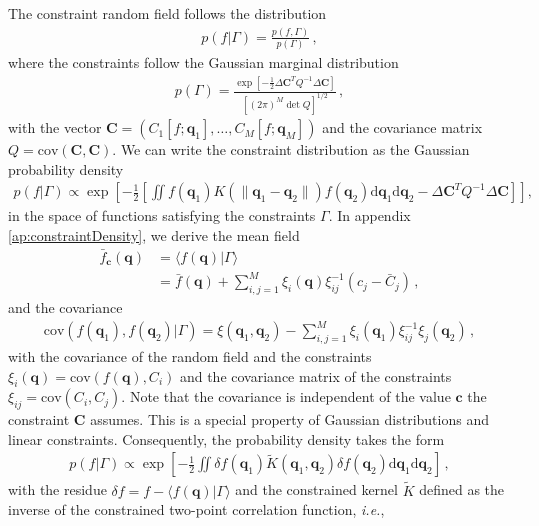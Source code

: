 \documentclass[a4paper, 11pt]{article}
\begin{document}
The constraint random field follows the distribution
\begin{align}
p(f|\Gamma) = \frac{p(f,\Gamma)}{p(\Gamma)}\,,
\end{align}
where the constraints follow the Gaussian marginal distribution
\begin{align}
p(\Gamma) = \frac{\exp\left[-\frac{1}{2} \Delta\bm{C}^T Q^{-1} \Delta\bm{C} \right]}{[(2\pi)^M \det Q]^{1/2}}\,,
\end{align}
with the vector $\bm{C}=(C_1[f;\bm{q}_1], \dots, C_M[f;\bm{q}_M])$ and the covariance matrix $Q = \text{cov}(\bm{C}, \bm{C})$. We can write the constraint distribution as the Gaussian probability density
\begin{align}
p(f|\Gamma) \propto  \exp\left[-\frac{1}{2} \left[\iint f(\bm{q}_1) K(\|\bm{q}_1 - \bm{q}_2\|) f(\bm{q}_2)\mathrm{d}\bm{q}_1 \mathrm{d}\bm{q}_2 -\Delta \bm{C}^TQ^{-1}\Delta \bm{C}\right]\right],\label{eq:constraint1}
\end{align}
in the space of functions satisfying the constraints $\Gamma$. In appendix \ref{ap:constraintDensity}, we derive the mean field
\begin{align}
\bar{f}_{\bm{c}}(\bm{q})&=\langle f(\bm{q})|\Gamma\rangle \nonumber \\
&= \bar{f}(\bm{q}) + \sum_{i,j=1}^M\xi_i (\bm{q})\xi_{ij}^{-1}(c_j-\bar{C}_j)\,,
\end{align}
and the covariance
\begin{align}
\text{cov}(f(\bm{q}_1),f(\bm{q}_2)|\Gamma)  = \xi(\bm{q}_1,\bm{q}_2) - \sum_{i,j=1}^M\xi_i(\bm{q}_1)\xi_{ij}^{-1}\xi_j(\bm{q}_2)\,,
\end{align}
with the covariance of the random field and the constraints $\xi_{i}(\bm{q}) = \text{cov}( f(\bm{q}), C_i)$ and the covariance matrix of the constraints $\xi_{ij} = \text{cov}( C_i ,C_j)$. Note that the covariance is independent of the value $\bm{c}$ the constraint $\bm{C}$ assumes. This is a special property of Gaussian distributions and linear constraints. Consequently, the probability density takes the form
\begin{align}
p( f|\Gamma) \propto  \exp\left[-\frac{1}{2} \iint \delta{f}(\bm{q}_1) \tilde{K}(\bm{q}_1,\bm{q}_2) \delta f(\bm{q}_2)\mathrm{d}\bm{q}_1 \mathrm{d}\bm{q}_2 \right]\,,\label{eq:constraint2}
\end{align}
with the residue $\delta f = f-\langle f(\bm{q})|\Gamma\rangle$ and the constrained kernel $\tilde{K}$ defined as the inverse of the constrained two-point correlation function, \textit{i.e.},
\end{document}
